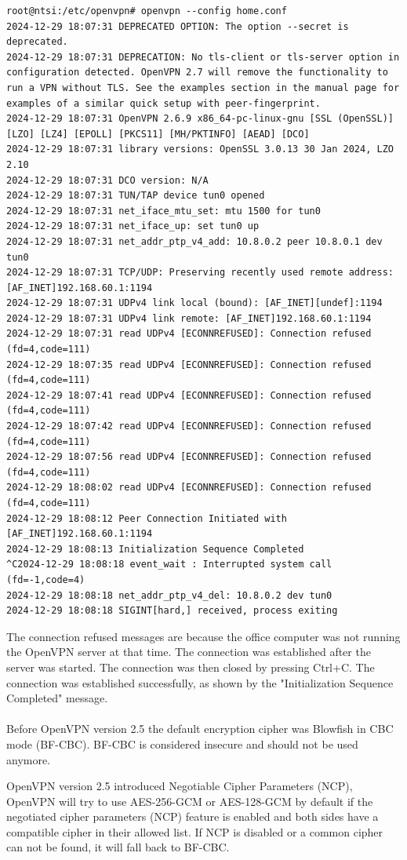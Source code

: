 \begin{verbatim}
root@ntsi:/etc/openvpn# openvpn --config home.conf
2024-12-29 18:07:31 DEPRECATED OPTION: The option --secret is deprecated.
2024-12-29 18:07:31 DEPRECATION: No tls-client or tls-server option in configuration detected. OpenVPN 2.7 will remove the functionality to run a VPN without TLS. See the examples section in the manual page for examples of a similar quick setup with peer-fingerprint.
2024-12-29 18:07:31 OpenVPN 2.6.9 x86_64-pc-linux-gnu [SSL (OpenSSL)] [LZO] [LZ4] [EPOLL] [PKCS11] [MH/PKTINFO] [AEAD] [DCO]
2024-12-29 18:07:31 library versions: OpenSSL 3.0.13 30 Jan 2024, LZO 2.10
2024-12-29 18:07:31 DCO version: N/A
2024-12-29 18:07:31 TUN/TAP device tun0 opened
2024-12-29 18:07:31 net_iface_mtu_set: mtu 1500 for tun0
2024-12-29 18:07:31 net_iface_up: set tun0 up
2024-12-29 18:07:31 net_addr_ptp_v4_add: 10.8.0.2 peer 10.8.0.1 dev tun0
2024-12-29 18:07:31 TCP/UDP: Preserving recently used remote address: [AF_INET]192.168.60.1:1194
2024-12-29 18:07:31 UDPv4 link local (bound): [AF_INET][undef]:1194
2024-12-29 18:07:31 UDPv4 link remote: [AF_INET]192.168.60.1:1194
2024-12-29 18:07:31 read UDPv4 [ECONNREFUSED]: Connection refused (fd=4,code=111)
2024-12-29 18:07:35 read UDPv4 [ECONNREFUSED]: Connection refused (fd=4,code=111)
2024-12-29 18:07:41 read UDPv4 [ECONNREFUSED]: Connection refused (fd=4,code=111)
2024-12-29 18:07:42 read UDPv4 [ECONNREFUSED]: Connection refused (fd=4,code=111)
2024-12-29 18:07:56 read UDPv4 [ECONNREFUSED]: Connection refused (fd=4,code=111)
2024-12-29 18:08:02 read UDPv4 [ECONNREFUSED]: Connection refused (fd=4,code=111)
2024-12-29 18:08:12 Peer Connection Initiated with [AF_INET]192.168.60.1:1194
2024-12-29 18:08:13 Initialization Sequence Completed
^C2024-12-29 18:08:18 event_wait : Interrupted system call (fd=-1,code=4)
2024-12-29 18:08:18 net_addr_ptp_v4_del: 10.8.0.2 dev tun0
2024-12-29 18:08:18 SIGINT[hard,] received, process exiting
\end{verbatim}

The connection refused messages are because the office computer was not running the OpenVPN server at that time. The connection was established after the server was started. The connection was then closed by pressing Ctrl+C. The connection was established successfully, as shown by the "Initialization Sequence Completed" message.
\\\\
Before OpenVPN version 2.5 the default encryption cipher was Blowfish in CBC mode (BF-CBC). BF-CBC is considered insecure and should not be used anymore.

OpenVPN version 2.5 introduced Negotiable Cipher Parameters (NCP), OpenVPN will try to use AES-256-GCM or AES-128-GCM by default if the negotiated cipher parameters (NCP) feature is enabled and both sides have a compatible cipher in their allowed list. If NCP is disabled or a common cipher can not be found, it will fall back to BF-CBC.